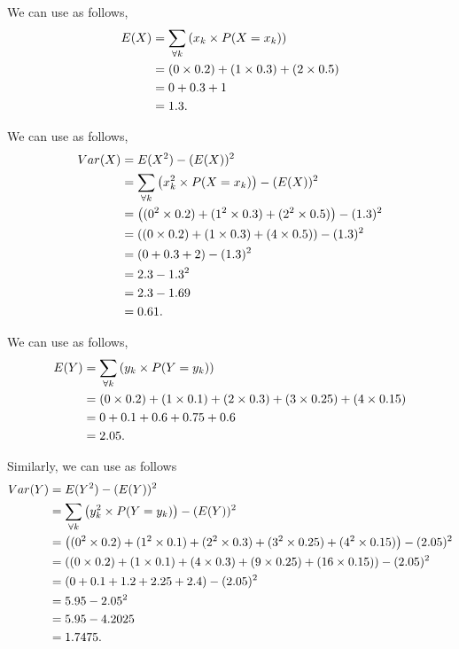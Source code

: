 \begin{subquestions}
\begin{subsubquestions}
\begin{subsubsubquestions}
We can use  as follows,
\begin{align}
	E(X) & =  \sum_{\forall k} \left(x_k \times P(X=x_k) \right) \nonumber \\
	     & = (0 \times 0.2)+(1 \times 0.3)+(2 \times 0.5) \nonumber \\
	     & = 0 + 0.3 + 1 \nonumber \\
	     & = 1.3.
\end{align}
	
\subsubsubquestion

We can use  as follows,
\begin{align}
	Var(X) & = E(X^2) - (E(X))^2 \nonumber \\
	       & =  \sum_{\forall k} \left(x^2_k \times P(X=x_k) \right) - (E(X))^2 \nonumber \\
	       & = \left((0^2 \times 0.2) + (1^2 \times 0.3) + (2^2 \times 0.5) \right) - (1.3)^2 \nonumber \\
	       & = \left((0 \times 0.2) + (1 \times 0.3) + (4 \times 0.5) \right) - (1.3)^2 \nonumber \\
	       & = \left(0 + 0.3 + 2 \right) - (1.3)^2 \nonumber \\
	       & = 2.3 - 1.3^2 \nonumber \\
	       & = 2.3 - 1.69 \nonumber \\
	       & = 0.61.
\end{align}
	
\subsubsubquestion

We can use  as follows,
\begin{align}
	E(Y) & =  \sum_{\forall k} \left(y_k \times P(Y=y_k) \right) \nonumber \\
	& = (0 \times 0.2)+(1 \times 0.1)+(2 \times 0.3)+(3 \times 0.25)+(4 \times 0.15)\nonumber \\
	& = 0 + 0.1 + 0.6 + 0.75 + 0.6 \nonumber \\
	& = 2.05.
\end{align}

\subsubsubquestion

Similarly, we can use  as follows
\begin{align}
	Var(Y) & = E(Y^2) - (E(Y))^2 \nonumber \\
	& =  \sum_{\forall k} \left(y^2_k \times P(Y=y_k) \right) - (E(Y))^2 \nonumber \\
	& = \left((0^2 \times 0.2) + (1^2 \times 0.1) + (2^2 \times 0.3) + (3^2 \times 0.25) + (4^2 \times 0.15)\right) - (2.05)^2 \nonumber \\
	& = \left((0 \times 0.2) + (1 \times 0.1) + (4 \times 0.3) + (9 \times 0.25) + (16 \times 0.15) \right) - (2.05)^2 \nonumber \\
	& = \left(0 + 0.1 + 1.2 + 2.25 + 2.4 \right) - (2.05)^2 \nonumber \\
	& = 5.95 - 2.05^2 \nonumber \\
	& = 5.95 - 4.2025 \nonumber \\
	& = 1.7475.
\end{align}


\end{subsubsubquestions}
\end{subsubquestions}
\end{subquestions}
